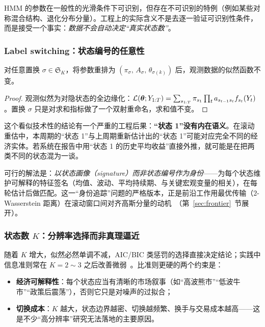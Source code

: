 HMM 的参数在一般性的光滑条件下可识别，但存在不可识别的特例（例如某些对称混合结构、退化分布分量）。工程上的实际含义不是去逐一验证可识别性条件，而是接受一个事实：\emph{数据不会自动决定“真实状态数”}。

\subsubsection{Label switching：状态编号的任意性}

\begin{proposition}[置换不变性]
对任意置换 $\sigma \in \mathfrak{S}_K$，将参数重排为 $(\pi_\sigma,\, A_\sigma,\, \theta_{\sigma(k)})$ 后，观测数据的似然函数不变。
\end{proposition}

\begin{proof}
观测似然为对隐状态的全边缘化：$\mathcal{L}(\bm{\theta}; Y_{1:T}) = \sum_{s_{1:T}} \pi_{s_1} \prod_t a_{s_{t-1}s_t} f_{s_t}(Y_t)$。置换 $\sigma$ 只是对求和指标做了一个双射重命名，求和值不变。
\end{proof}

这个看似技术性的结论有一个严重的工程后果：\textbf{“状态 1”没有内在语义}。在滚动重估中，本周期的“状态 1”与上周期重新估计出的“状态 1”可能对应完全不同的经济实体。若系统在报告中用“状态 1 的历史平均收益”直接外推，就可能是在把两类不同的状态混为一谈。

可行的解法是：\emph{以状态画像（signature）而非状态编号作为身份}——为每个状态维护可解释的特征签名（均值、波动、平均持续期、与关键宏观变量的相关），在每轮估计后做匹配。这一“身份追踪”问题的严格版本，正是前沿工作用最优传输（$2$-Wasserstein 距离）在滚动窗口间对齐高斯分量的动机~\cite{boukardagha2026}（第~\ref{sec:frontier}~节展开）。

\subsubsection{状态数 \texorpdfstring{$K$}{K}：分辨率选择而非真理逼近}

随着 $K$ 增大，似然必然单调不减，AIC/BIC 类惩罚的选择直接决定结论；实践中信息准则常在 $K = 2 \sim 3$ 之后改善微弱~\cite{nystrup2018}。比准则更硬的两个约束是：

\begin{itemize}[itemsep=2pt]
\item \textbf{经济可解释性}：每个状态应当有清晰的市场叙事（如“高波熊市”“低波牛市”“政策后震荡”），否则它只是对噪声的过拟合；
\item \textbf{切换成本}：$K$ 越大，状态边界越密、切换越频繁、换手与交易成本越高——这是不少“高分辨率”研究无法落地的主要原因。
\end{itemize}

